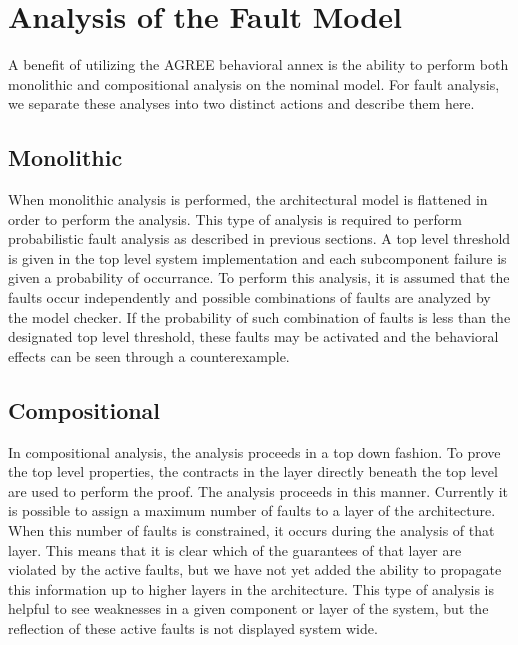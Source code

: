 \section{Analysis of the Fault Model}
\label{sec:fault_analysis}

A  benefit of utilizing the AGREE behavioral annex is the ability to perform both monolithic and compositional analysis on the nominal model. For fault analysis, we separate these analyses into two distinct actions and describe them here.

\subsection{Monolithic}
When monolithic analysis is performed, the architectural model is flattened in order to perform the analysis. This type of analysis is required to perform probabilistic fault analysis as described in previous sections. A top level threshold is given in the top level system implementation and each subcomponent failure is given a probability of occurrance. To perform this analysis, it is assumed that the faults occur independently and possible combinations of faults are analyzed  by the model checker. If the probability of such combination of faults is less than the designated top level threshold, these faults may be activated and the behavioral effects can be seen through a counterexample.  

\subsection{Compositional}
In compositional analysis, the analysis proceeds in a top down fashion. To prove the top level properties, the contracts in the layer directly beneath the top level are used to perform the proof. The analysis proceeds in this manner. Currently it is possible to assign a maximum number of faults to a layer of the architecture. When this number of faults is constrained, it occurs during the analysis of that layer. This means that it is clear which of the guarantees of that layer are violated by the active faults, but we have not yet added the ability to propagate this information up to higher layers in the architecture. This type of analysis is helpful to see weaknesses in a given component or layer of the system, but the reflection of these active faults is not displayed system wide.


